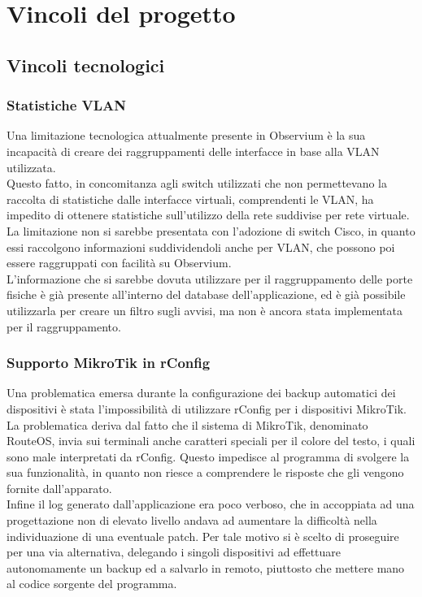 \documentclass[Tesi.tex]{subfiles}
\begin{document}
\newpage
\section{Vincoli del progetto}
\subsection{Vincoli tecnologici}
\subsubsection{Statistiche VLAN}
Una limitazione tecnologica attualmente presente in Observium è la sua incapacità di creare dei raggruppamenti delle interfacce in base alla VLAN utilizzata. \\
Questo fatto, in concomitanza agli switch utilizzati che non permettevano la raccolta di statistiche dalle interfacce virtuali, comprendenti le VLAN, ha impedito di ottenere statistiche sull'utilizzo della rete suddivise per rete virtuale. \\
La limitazione non si sarebbe presentata con l'adozione di switch Cisco, in quanto essi raccolgono informazioni suddividendoli anche per VLAN, che possono poi essere raggruppati con facilità su Observium. \\
L'informazione che si sarebbe dovuta utilizzare per il raggruppamento delle porte fisiche è già presente all'interno del database dell'applicazione, ed è già possibile utilizzarla per creare un filtro sugli avvisi, ma non è ancora stata implementata per il raggruppamento.

\subsubsection{Supporto MikroTik in rConfig}
Una problematica emersa durante la configurazione dei backup automatici dei dispositivi è stata l'impossibilità di utilizzare rConfig per i dispositivi MikroTik. \\
La problematica deriva dal fatto che il sistema di MikroTik, denominato RouteOS, invia sui terminali anche caratteri speciali per il colore del testo, i quali sono male interpretati da rConfig. Questo impedisce al programma di svolgere la sua funzionalità, in quanto non riesce a comprendere le risposte che gli vengono fornite dall'apparato. \\
Infine il log generato dall'applicazione era poco verboso, che in accoppiata ad una progettazione non di elevato livello andava ad aumentare la difficoltà nella individuazione di una eventuale patch. Per tale motivo si è scelto di proseguire per una via alternativa, delegando i singoli dispositivi ad effettuare autonomamente un backup ed a salvarlo in remoto, piuttosto che mettere mano al codice sorgente del programma.
\end{document}

